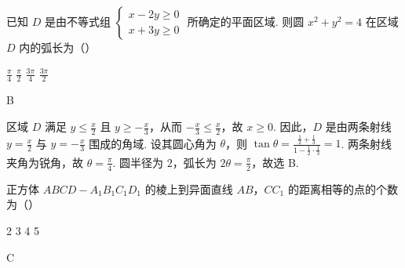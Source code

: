 \begin{problem}
已知 \(D\) 是由不等式组 \(\begin{cases}
x - 2y \geqslant 0\\
x + 3y \geqslant 0
\end{cases}\) 所确定的平面区域. 则圆 \(x^2 + y^2 = 4\) 在区域 \(D\) 内的弧长为（\quad）

\choices
    {\( \frac{\pi}{4} \)}
    {\( \frac{\pi}{2} \)}
    {\( \frac{3\pi}{4} \)}
    {\( \frac{3\pi}{2} \)}
\end{problem}

\begin{answer}
B
\end{answer}

\begin{solution}
区域 \(D\) 满足 \(y\leqslant\frac{x}{2}\) 且 \(y\geqslant-\frac{x}{3}\)，从而 \(-\frac{x}{3}\leqslant\frac{x}{2}\)，故 \(x\geqslant0\). 因此，\(D\) 是由两条射线 \(y=\frac{x}{2}\) 与 \(y=-\frac{x}{3}\) 围成的角域. 设其圆心角为 \(\theta\)，则 \(\tan\theta=\frac{\frac12+\frac13}{1-\frac12\cdot\frac13}=1\). 两条射线夹角为锐角，故 \(\theta=\frac{\pi}{4}\). 圆半径为 \(2\)，弧长为 \(2\theta=\frac{\pi}{2}\)，故选 B.
\end{solution}

\begin{problem}
正方体 \(ABCD - A_{1}B_{1}C_{1}D_{1}\) 的棱上到异面直线 \(AB\)，\(CC_{1}\) 的距离相等的点的个数为（\quad）

\choices
    {2}
    {3}
    {4}
    {5}
\end{problem}

\begin{answer}
C
\end{answer}

